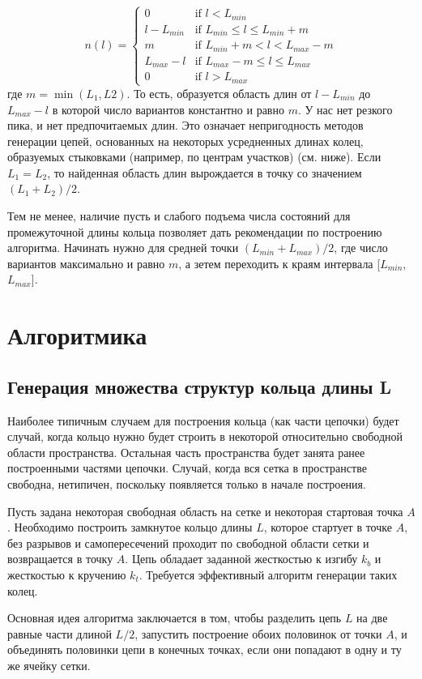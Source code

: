 \documentclass[tikz,a4paper]{scrartcl} %
\begin{document}
\[ n(l) = \begin{cases} 
0 			&\mbox{if } l < L_{min} \\ 
l - L_{min}	&\mbox{if } L_{min} \leq l \leq L_{min} + m \\ 
m			&\mbox{if } L_{min} + m < l < L_{max} - m \\ 
L_{max} - l 	&\mbox{if } L_{max} - m \leq l \leq L_{max}  \\
0 			&\mbox{if } l > L_{max} 
\end{cases} \]
где $m = \min(L_1, L2)$. То есть, образуется область длин от $l-L_{min}$ до $L_{max}-l$ в которой число вариантов константно и равно $m$. У нас нет резкого пика, и нет предпочитаемых длин. Это означает непригодность методов генерации цепей, основанных на некоторых усредненных длинах колец, образуемых стыковками (например, по центрам участков) (см. ниже). Если $L_1 = L_2$, то найденная область длин вырождается в точку со значением $(L_1 + L_2)/2$.

Тем не менее, наличие пусть и слабого подъема числа состояний для промежуточной длины кольца позволяет дать рекомендации по построению алгоритма. Начинать нужно для средней точки $(L_{min} + L_{max})/2$, где число вариантов максимально и равно $m$, а зетем переходить к краям интервала [$L_{min}$, $L_{max}$].

\section*{Алгоритмика}
\subsection*{Генерация множества структур кольца длины L}
Наиболее типичным случаем для построения кольца (как части цепочки) будет случай, когда кольцо нужно будет строить в некоторой относительно свободной области пространства. Остальная часть пространства будет занята ранее построенными частями цепочки. Случай, когда вся сетка в пространстве свободна, нетипичен, поскольку появляется только в начале построения.

Пусть задана некоторая свободная область на сетке и некоторая стартовая точка $A$. Необходимо построить замкнутое кольцо длины $L$, которое стартует в точке $A$, без разрывов и самопересечений проходит по свободной области сетки и возвращается в точку $A$. Цепь обладает заданной жесткостью к изгибу $k_b$ и жесткостью к кручению $k_t$. Требуется эффективный алгоритм генерации таких колец.

Основная идея алгоритма заключается в том, чтобы разделить цепь $L$ на две равные части длиной $L/2$, запустить построение обоих половинок от точки $A$, и объединять половинки цепи в конечных точках, если они попадают в одну и ту же ячейку сетки.
\end{document}

